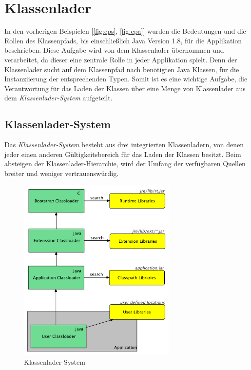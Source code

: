 \section{Klassenlader}\label{sec:cl}

  In den vorherigen Beispielen [\ref{fig:cps}, \ref{fig:cpa}] wurden die Bedeutungen und die Rollen des Klassenpfads, bis einschließlich Java Version 1.8, für die Applikation beschrieben. Diese Aufgabe wird von dem Klassenlader übernommen und verarbeitet, da dieser eine zentrale Rolle in jeder Applikation spielt. Denn der Klassenlader sucht auf dem Klassenpfad nach benötigten Java Klassen, für die Instanziierung der entsprechenden Typen. Somit ist es eine wichtige Aufgabe, die Verantwortung für das Laden der Klassen über eine Menge von Klassenlader aus dem \textit{Klassenlader-System} aufgeteilt. 


  \subsection{Klassenlader-System} \label{sec:cls}

    Das \textit{Klassenlader-System} besteht aus drei integrierten Klassenladern, von denen jeder einen anderen Gültigkeitsbereich für das Laden der Klassen besitzt. Beim absteigen der Klassenlader-Hierarchie, wird der Umfang der verfügbaren Quellen breiter und weniger vertrauenswürdig. 

    \begin{figure}[h!]
      \centering
      \includegraphics[width=0.7\textwidth]{material/images/Classloader-Hierarhie2.pdf}
      \caption{Klassenlader-System \cite{classLoadingIntro}}
      \label{fig:cl}
    \end{figure}
    

